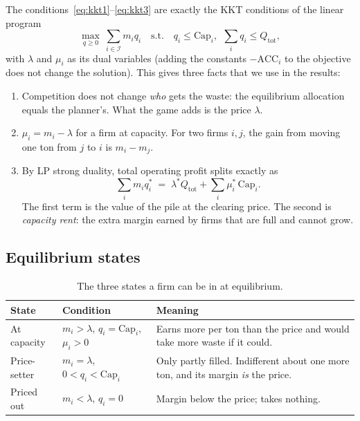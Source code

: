 \documentclass[11pt]{article}
\begin{document}
The conditions~\eqref{eq:kkt1}--\eqref{eq:kkt3} are exactly the KKT conditions of
the linear program
\begin{equation}
\max_{q\ge0}\ \sum_{i\in\mathcal I} m_i q_i
\quad\text{s.t.}\quad q_i\le\mathrm{Cap}_i,\ \ \sum_i q_i\le Q_{\mathrm{tot}},
\label{eq:planner}
\end{equation}
with $\lambda$ and $\mu_i$ as its dual variables (adding the constants
$-\mathrm{ACC}_i$ to the objective does not change the solution). This gives three
facts that we use in the results:
\begin{enumerate}[leftmargin=1.6em,itemsep=0.1em]
  \item Competition does not change \emph{who} gets the waste: the equilibrium
        allocation equals the planner's. What the game adds is the price $\lambda$.
  \item $\mu_i=m_i-\lambda$ for a firm at capacity. For two firms $i,j$, the gain
        from moving one ton from $j$ to $i$ is $m_i-m_j$.
  \item By LP strong duality, total operating profit splits exactly as
        \begin{equation}
        \sum_i m_i q_i^\ast \;=\; \lambda^\ast Q_{\mathrm{tot}}+\sum_i\mu_i^\ast\,\mathrm{Cap}_i .
        \label{eq:profit}
        \end{equation}
        The first term is the value of the pile at the clearing price. The second
        is \emph{capacity rent}: the extra margin earned by firms that are full
        and cannot grow.
\end{enumerate}

\subsection{Equilibrium states}

\begin{table}[h]
\centering
\caption{The three states a firm can be in at equilibrium.}
\label{tab:states}
\small
\renewcommand{\arraystretch}{1.25}
\begin{tabular}{@{}>{\raggedright\arraybackslash}p{2.6cm}>{\raggedright\arraybackslash}p{4.2cm}>{\raggedright\arraybackslash}p{8.1cm}@{}}
\toprule
\textbf{State} & \textbf{Condition} & \textbf{Meaning} \\
\midrule
At capacity & $m_i>\lambda$, $q_i=\mathrm{Cap}_i$, $\mu_i>0$ & Earns more per ton than the price and would take more waste if it could. \\
Price-setter & $m_i=\lambda$, $0<q_i<\mathrm{Cap}_i$ & Only partly filled. Indifferent about one more ton, and its margin \emph{is} the price. \\
Priced out & $m_i<\lambda$, $q_i=0$ & Margin below the price; takes nothing. \\
\bottomrule
\end{tabular}
\end{table}
\end{document}
